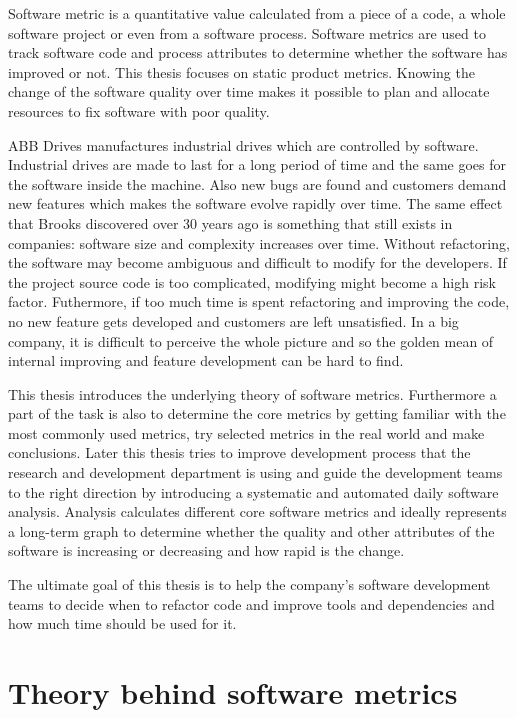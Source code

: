 Software metric is a quantitative value calculated from a piece of a code, a whole software project or even from a software process. Software metrics are used to track software code and process attributes to determine whether the software has improved or not. This thesis focuses on static product metrics. Knowing the change of the software quality over time makes it possible to plan and allocate resources to fix software with poor quality.

ABB Drives manufactures industrial drives which are controlled by software. Industrial drives are made to last for a long period of time and the same goes for the software inside the machine. Also new bugs are found and customers demand new features which makes the software evolve rapidly over time. The same effect that Brooks discovered over 30 years ago is something that still exists in companies: software size and complexity increases over time. Without refactoring, the software may become ambiguous and difficult to modify for the developers. If the project source code is too complicated, modifying might become a high risk factor. Futhermore, if too much time is spent refactoring and improving the code, no new feature gets developed and customers are left unsatisfied. In a big company, it is difficult to perceive the whole picture and so the golden mean of internal improving and feature development can be hard to find.

This thesis introduces the underlying theory of software metrics. Furthermore a part of the task is also to determine the core metrics by getting familiar with the most commonly used metrics, try selected metrics in the real world and make conclusions. Later this thesis tries to improve development process that the research and development department is using and guide the development teams to the right direction by introducing a systematic and automated daily software analysis. Analysis calculates different core software metrics and ideally represents a long-term graph to determine whether the quality and other attributes of the software is increasing or decreasing and how rapid is the change.

The ultimate goal of this thesis is to help the company’s software development teams to decide when to refactor code and improve tools and dependencies and how much time should be used for it.



\chapter{Theory behind software metrics}
\label{chap:theory}

